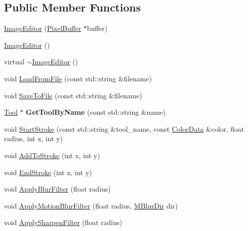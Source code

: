 \subsection*{Public Member Functions}
\begin{DoxyCompactItemize}
\item 
\hyperlink{classimage__tools_1_1ImageEditor_ae2c556649a8961a0ff7caf5058a6c12c}{Image\+Editor} (\hyperlink{classimage__tools_1_1PixelBuffer}{Pixel\+Buffer} $\ast$buffer)
\item 
\hyperlink{classimage__tools_1_1ImageEditor_a7665987647451a161e28b918436d0d10}{Image\+Editor} ()
\item 
virtual \hyperlink{classimage__tools_1_1ImageEditor_ad3a824c648aee5889643207960d600d5}{$\sim$\+Image\+Editor} ()
\item 
void \hyperlink{classimage__tools_1_1ImageEditor_a2eadb26d997e0a8b03c30b6181215b87}{Load\+From\+File} (const std\+::string \&filename)
\item 
void \hyperlink{classimage__tools_1_1ImageEditor_a9a99dba9070acc0cfe40b33e052a497e}{Save\+To\+File} (const std\+::string \&filename)
\item 
\mbox{\label{classimage__tools_1_1ImageEditor_a031831a77dc2b9728938000077be1d80}} 
\hyperlink{classimage__tools_1_1Tool}{Tool} $\ast$ {\bfseries Get\+Tool\+By\+Name} (const std\+::string \&name)
\item 
void \hyperlink{classimage__tools_1_1ImageEditor_a396d6b86c6d740714f4311737a40e19c}{Start\+Stroke} (const std\+::string \&tool\+\_\+name, const \hyperlink{classimage__tools_1_1ColorData}{Color\+Data} \&color, float radius, int x, int y)
\item 
void \hyperlink{classimage__tools_1_1ImageEditor_ab3e3fdaa5a72bfb4a8004bd151c97921}{Add\+To\+Stroke} (int x, int y)
\item 
void \hyperlink{classimage__tools_1_1ImageEditor_a14b562aac1107fec7f28a53fe44f2550}{End\+Stroke} (int x, int y)
\item 
void \hyperlink{classimage__tools_1_1ImageEditor_a4d610808946e2125d0ac1a702ec88f77}{Apply\+Blur\+Filter} (float radius)
\item 
void \hyperlink{classimage__tools_1_1ImageEditor_aaf09cb82f92d3d78583b631ac2ca2809}{Apply\+Motion\+Blur\+Filter} (float radius, \hyperlink{classimage__tools_1_1ImageEditor_a20bacf2756f1b97eed82d2fee9628ac2}{M\+Blur\+Dir} dir)
\item 
void \hyperlink{classimage__tools_1_1ImageEditor_a7b3c650d9caa4795fb5decc03969320d}{Apply\+Sharpen\+Filter} (float radius)

\end{DoxyCompactItemize}
